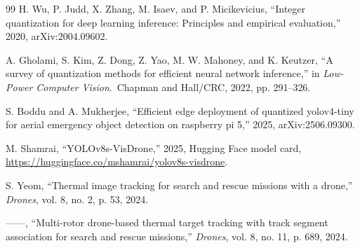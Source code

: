 \documentclass[conference]{IEEEtran}
\begin{document}
\begin{thebibliography}{99}
H. Wu, P. Judd, X. Zhang, M. Isaev, and P. Micikevicius, ``Integer quantization
for deep learning inference: Principles and empirical evaluation,'' 2020,
arXiv:2004.09602.

A. Gholami, S. Kim, Z. Dong, Z. Yao, M. W. Mahoney, and K. Keutzer, ``A survey
of quantization methods for efficient neural network inference,'' in
\emph{Low-Power Computer Vision}.\ Chapman and Hall/CRC, 2022, pp. 291--326.

S. Boddu and A. Mukherjee, ``Efficient edge deployment of quantized yolov4-tiny
for aerial emergency object detection on raspberry pi 5,'' 2025,
arXiv:2506.09300.

M. Shamrai, ``YOLOv8s-VisDrone,'' 2025, Hugging Face model card,
\url{https://huggingface.co/mshamrai/yolov8s-visdrone}.

S. Yeom, ``Thermal image tracking for search and rescue missions with a
drone,'' \emph{Drones}, vol. 8, no. 2, p. 53, 2024.

------, ``Multi-rotor drone-based thermal target tracking with track segment
association for search and rescue missions,'' \emph{Drones}, vol. 8, no. 11,
p. 689, 2024.

\end{thebibliography}
\end{document}
